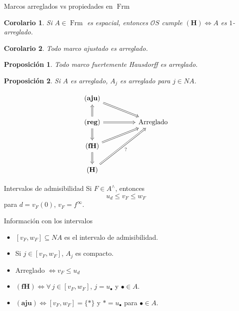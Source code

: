 \documentclass[compress,12pt]{beamer}
\DeclareMathOperator{\Frm}{Frm}
\newtheorem{cor}{Corolario}
\newtheorem{prop}{Proposición}
\begin{document}
\begin{frame}{Marcos arreglados vs propiedades en $\Frm$}
\begin{cor}
Si $A\in \Frm$ es espacial, entonces $\mathcal{O}S$ cumple $\mathbf{(H)}\Leftrightarrow A$ es $1$-arreglado.
\end{cor}

\begin{cor}
	Todo marco ajustado es arreglado.
\end{cor}

\begin{prop}
Todo marco fuertemente Hausdorff es arreglado.
\end{prop}

\begin{prop}
Si $A$ es arreglado, $A_j$ es arreglado para $j\in NA$.
\end{prop}

\end{frame}

\begin{frame}[fragile]
\[\begin{tikzcd}
	{\mathbf{(aju)}} \\
	{\mathbf{(reg)}} && {\mbox{Arreglado}} \\
	{\mathbf{(fH)}} \\
	{\mathbf{(H)}}
	\arrow[Rightarrow, from=1-1, to=2-3]
	\arrow[Rightarrow, from=2-1, to=1-1]
	\arrow[Rightarrow, from=2-1, to=2-3]
	\arrow[Rightarrow, from=2-1, to=3-1]
	\arrow[Rightarrow, from=3-1, to=2-3]
	\arrow[Rightarrow, from=3-1, to=4-1]
	\arrow["{?}"', Rightarrow, from=4-1, to=2-3]
\end{tikzcd}\]
\end{frame}

\begin{frame}{Intervalos de admisibilidad}
Si $F\in A^\wedge$, entonces 
\[
u_d\leq v_F \leq  w_F
\] 
para $d=v_F(0)$, $v_F=f^\infty$.

\begin{block}{Información con los intervalos}
\begin{itemize}
\item $[v_F, w_F]\subseteq NA$ es el intervalo de admisibilidad.
\item Si $j\in [v_F,w_F]$, $A_j$ es compacto.
\item Arreglado $\Leftrightarrow v_F\leq u_d$
\item $\mathbf{(fH)}\Leftrightarrow\forall\, j\in [v_F,w_F]$, $j=u_\bullet$ y $\bullet\in A$.  
\item $\mathbf{(aju)}\Leftrightarrow [v_F,w_F]=\{*\}$ y $*=u_\bullet$ para $\bullet\in A$. 
\end{itemize}
\end{block}
\end{frame}
\end{document}
